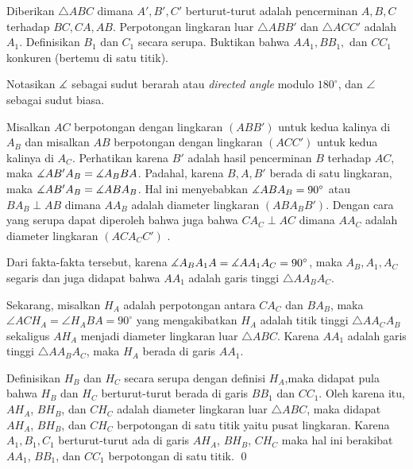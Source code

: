 \documentclass[12pt]{scrartcl}
\begin{document}
	\begin{soalbaru} 
		Diberikan $\triangle ABC$ dimana $A',B',C'$ berturut-turut adalah pencerminan $A,B,C$ terhadap $BC,CA,AB$. Perpotongan lingkaran luar $\triangle ABB'$ dan $\triangle ACC'$ adalah $A_1$. Definisikan $B_1$ dan $C_1$ secara serupa. Buktikan bahwa $AA_1,BB_1,$ dan $CC_1$ konkuren (bertemu di satu titik).\\[-10pt]
		
		\begin{solusi}
		Notasikan $\measuredangle$ sebagai sudut berarah atau \textit{ directed angle} modulo $180^\circ$, dan $\angle$ sebagai sudut biasa.
		
		Misalkan $AC$ berpotongan dengan lingkaran $(ABB')$ untuk kedua kalinya di $A_B$ dan misalkan $AB$ berpotongan dengan lingkaran $(ACC')$ untuk kedua kalinya di $A_C$. Perhatikan karena $B'$ adalah hasil pencerminan $B$ terhadap $AC$, maka $\measuredangle AB'A_B = \measuredangle A_BBA$. Padahal, karena $B,A,B'$ berada di satu lingkaran, maka $\measuredangle AB'A_B = \measuredangle ABA_B $. Hal ini menyebabkan $\measuredangle ABA_B = 90^\circ$ atau $BA_B \perp AB$ dimana $AA_B$ adalah diameter lingkaran $(ABA_BB')$. Dengan cara yang serupa dapat diperoleh bahwa juga bahwa $CA_C \perp AC$ dimana $AA_C$ adalah diameter lingkaran $(ACA_CC')$ .
		
		Dari fakta-fakta tersebut, karena $\measuredangle A_BA_1A = \measuredangle AA_1A_C = 90^\circ$, maka $A_B, A_1, A_C$ segaris dan juga didapat bahwa $AA_1$ adalah garis tinggi $\triangle AA_BA_C$.
		
		Sekarang, misalkan $H_A$ adalah perpotongan antara $CA_C$ dan $BA_B$, maka $\angle ACH_A = \angle H_ABA = 90^\circ$ yang mengakibatkan $H_A$ adalah titik tinggi $\triangle AA_CA_B$ sekaligus $AH_A$ menjadi diameter lingkaran luar $\triangle ABC$. Karena $AA_1$ adalah garis tinggi $\triangle AA_BA_C$, maka $H_A$ berada di garis $AA_1$.
		
		Definisikan $H_B$ dan $H_C$ secara serupa dengan definisi $H_A$,maka didapat pula bahwa $H_B$ dan $H_C$ berturut-turut berada di garis $BB_1$ dan $CC_1$. Oleh karena itu, $AH_A$, $BH_B$, dan $CH_C$ adalah diameter lingkaran luar $\triangle ABC$, maka didapat $AH_A$, $BH_B$, dan $CH_C$ berpotongan di satu titik yaitu pusat lingkaran. Karena $A_1,B_1,C_1$ berturut-turut ada di garis $AH_A$, $BH_B$, $CH_C$ maka hal ini berakibat $AA_1$, $BB_1$, dan $CC_1$ berpotongan di satu titik. \qed
		\end{solusi}
	\end{soalbaru}
	
\end{document}
